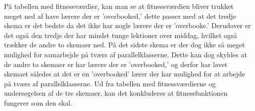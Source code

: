 På tabellen med fitnessværdier, kan man se at fitnessværdien bliver trukket meget ned af have lærere der er ’overbooked,’ dette passer med at det tredje skema er det bedste da det ikke har nogle lærere der er ’overbooke.’ Derudover er det også den tredje der har mindst tunge lektioner over middag, hvilket også trækker de andre to skemaer ned. På det sidste skema er der dog ikke så meget mulighed for samarbejde på tværs af parallelklasserne. Dette kan dog skyldes at de andre to skemaer er har lærere der er ’overbooked,’ og derfor har lavet skemaet således at det er en ’overbooked’ lærer der har mulighed for at arbejde på tværs af parallelklasserne.
Ud fra tabellen med fitnessværdierne og undersøgelsen af de tre skemaer, kan det konkluderes at fitnessfunktionen fungerer som den skal. 
